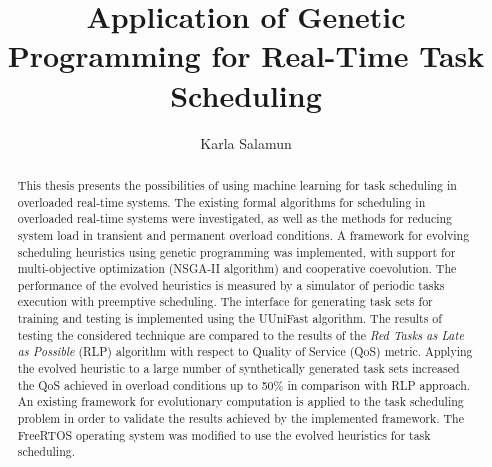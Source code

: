 \documentclass[utf8, diplomski, english, numeric]{fer}
\begin{document}

\title{Application of Genetic Programming for Real-Time Task Scheduling}

\author{Karla Salamun}

\maketitle



\zahvala{}

\tableofcontents
\listoffigures











\begin{abstract}
This thesis presents the possibilities of using machine learning for task scheduling in overloaded real-time systems.
The existing formal algorithms for scheduling in overloaded real-time systems were investigated, as well as the methods for reducing system load in transient and permanent overload conditions.
A framework for evolving scheduling heuristics using genetic programming was implemented, with support for multi-objective optimization (NSGA-II algorithm) and cooperative coevolution.
The performance of the evolved heuristics is measured by a simulator of periodic tasks execution with preemptive scheduling.
The interface for generating task sets for training and testing is implemented using the UUniFast algorithm.
The results of testing the considered technique are compared to the results of the \textit{Red Tasks as Late as Possible} (RLP) algorithm with respect to Quality of Service (QoS) metric.
Applying the evolved heuristic to a large number of synthetically generated task sets increased the QoS achieved in overload conditions up to 50\% in comparison with RLP approach.
An existing framework for evolutionary computation is applied to the task scheduling problem in order to validate the results achieved by the implemented framework.
The FreeRTOS operating system was modified to use the evolved heuristics for task scheduling.

\end{abstract}
\end{document}

